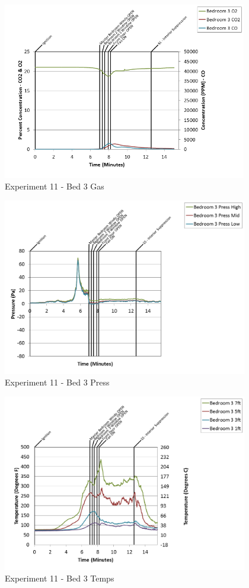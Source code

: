 \documentclass{article}
\begin{document}
\begin{appendices}
\clearpage

\begin{figure}[h!]
	\centering
	\includegraphics[height=3.05in]{0_Images/Results_Charts/Exp_11_Charts/Bed3Gas.png}
	\caption{Experiment 11 - Bed 3 Gas}
\end{figure}


\begin{figure}[h!]
	\centering
	\includegraphics[height=3.05in]{0_Images/Results_Charts/Exp_11_Charts/Bed3Press.png}
	\caption{Experiment 11 - Bed 3 Press}
\end{figure}

\clearpage

\begin{figure}[h!]
	\centering
	\includegraphics[height=3.05in]{0_Images/Results_Charts/Exp_11_Charts/Bed3Temps.png}
	\caption{Experiment 11 - Bed 3 Temps}
\end{figure}



\end{appendices}
\end{document}
